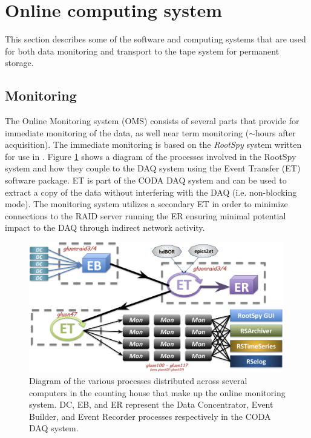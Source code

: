 
\section[Online computing system]{Online computing system \label{sec:online}}

This section describes some of the \GX software and computing systems that are used for both data monitoring and transport to the tape system for permanent storage.

\subsection{Monitoring \label{sec:onlinemonitoring}}

The Online Monitoring system (OMS) consists of several parts that provide for immediate monitoring of the data, as well near term monitoring ($\sim$hours after acquisition). The immediate monitoring is based on the \textit{RootSpy} system\cite{rootspy} written for use in \GX. Figure \ref{fig:online_monitoring_processes} shows a diagram of the processes involved in the RootSpy system and how they couple to the DAQ system using the Event Transfer (ET) software package. ET is part of the CODA DAQ system\cite{coda} and can be used to extract a copy of the data without interfering with the DAQ (i.e. non-blocking mode). The monitoring system utilizes a secondary ET in order to minimize connections to the RAID server running the ER ensuring minimal potential impact to the DAQ through indirect network activity.

\begin{figure}[tbp]
\begin{center}
\includegraphics[width=0.99\textwidth]{figures/online_monitoring_processes.png}
\caption{\label{fig:online_monitoring_processes}Diagram of the various processes distributed across several computers in the counting house that make up the online monitoring system. DC, EB, and ER represent the Data Concentrator, Event Builder, and Event Recorder processes respectively in the CODA DAQ system.}   
\end{center}  
\end{figure}

